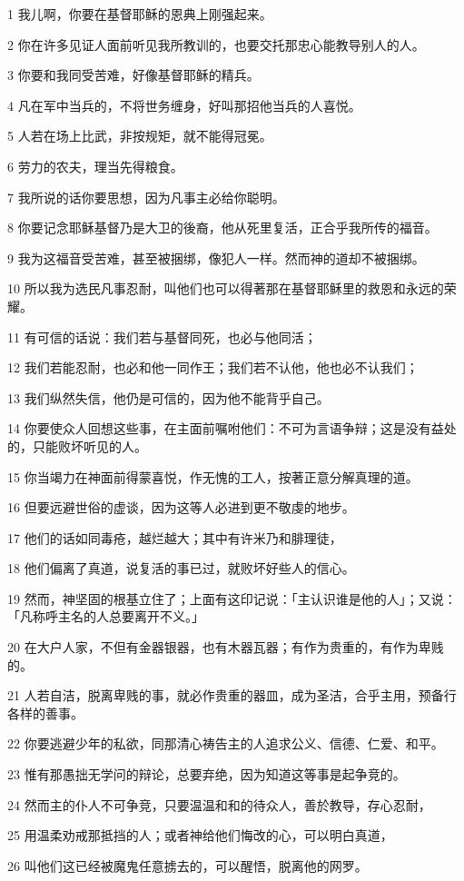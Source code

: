\par 1 我儿啊，你要在基督耶稣的恩典上刚强起来。
\par 2 你在许多见证人面前听见我所教训的，也要交托那忠心能教导别人的人。
\par 3 你要和我同受苦难，好像基督耶稣的精兵。
\par 4 凡在军中当兵的，不将世务缠身，好叫那招他当兵的人喜悦。
\par 5 人若在场上比武，非按规矩，就不能得冠冕。
\par 6 劳力的农夫，理当先得粮食。
\par 7 我所说的话你要思想，因为凡事主必给你聪明。
\par 8 你要记念耶稣基督乃是大卫的後裔，他从死里复活，正合乎我所传的福音。
\par 9 我为这福音受苦难，甚至被捆绑，像犯人一样。然而神的道却不被捆绑。
\par 10 所以我为选民凡事忍耐，叫他们也可以得著那在基督耶稣里的救恩和永远的荣耀。
\par 11 有可信的话说：我们若与基督同死，也必与他同活；
\par 12 我们若能忍耐，也必和他一同作王；我们若不认他，他也必不认我们；
\par 13 我们纵然失信，他仍是可信的，因为他不能背乎自己。
\par 14 你要使众人回想这些事，在主面前嘱咐他们：不可为言语争辩；这是没有益处的，只能败坏听见的人。
\par 15 你当竭力在神面前得蒙喜悦，作无愧的工人，按著正意分解真理的道。
\par 16 但要远避世俗的虚谈，因为这等人必进到更不敬虔的地步。
\par 17 他们的话如同毒疮，越烂越大；其中有许米乃和腓理徒，
\par 18 他们偏离了真道，说复活的事已过，就败坏好些人的信心。
\par 19 然而，神坚固的根基立住了；上面有这印记说：「主认识谁是他的人」；又说：「凡称呼主名的人总要离开不义。」
\par 20 在大户人家，不但有金器银器，也有木器瓦器；有作为贵重的，有作为卑贱的。
\par 21 人若自洁，脱离卑贱的事，就必作贵重的器皿，成为圣洁，合乎主用，预备行各样的善事。
\par 22 你要逃避少年的私欲，同那清心祷告主的人追求公义、信德、仁爱、和平。
\par 23 惟有那愚拙无学问的辩论，总要弃绝，因为知道这等事是起争竞的。
\par 24 然而主的仆人不可争竞，只要温温和和的待众人，善於教导，存心忍耐，
\par 25 用温柔劝戒那抵挡的人；或者神给他们悔改的心，可以明白真道，
\par 26 叫他们这已经被魔鬼任意掳去的，可以醒悟，脱离他的网罗。

